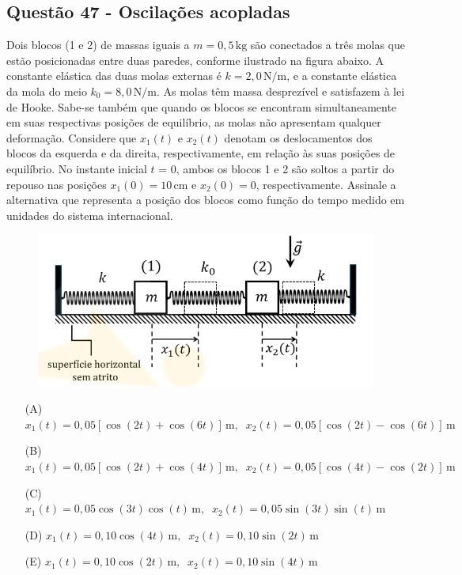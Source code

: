 \documentclass[a4paper,12pt]{article}
\begin{document}
\begin{flushleft}
\subsection{Quest\~ao 47 - Oscila\c{c}\~oes acopladas}

Dois blocos (1 e 2) de massas iguais a  $m = 0,5\,\text{kg}$ são conectados a três molas que
estão posicionadas entre duas paredes, conforme ilustrado na figura abaixo. A constante elástica das
duas molas externas é $k = 2,0\,\text{N/m}$, e a constante elástica da mola do meio $k_0 = 8,0\,\text{N/m}$. As molas
têm massa desprezível e satisfazem à lei de Hooke. Sabe-se também que quando os blocos se
encontram simultaneamente em suas respectivas posições de equilíbrio, as molas não apresentam
qualquer deformação. Considere que $x_1(t)$ e $x_2(t)$ denotam os deslocamentos dos blocos da esquerda
e da direita, respectivamente, em relação às suas posições de equilíbrio. No instante inicial $t$ = 0,
ambos os blocos 1 e 2 são soltos a partir do repouso nas posições $x_1(0)=10\,\text{cm}$ e $x_2(0)=0$,
respectivamente. Assinale a alternativa que representa a posição dos blocos como função do tempo
medido em unidades do sistema internacional.

\begin{figure}[!h]
  \centering
  \includegraphics[scale=0.5]{figures/sistema-massa-mola.png}
\end{figure}

\begin{itemize}
\item[(A)] $x_1(t)=0,05[\cos(2t)+\cos(6t)]\,\text{m}, \;\; x_2(t)=0,05[\cos(2t)-\cos(6t)]\,\text{m}$
\item[(B)] $x_1(t)=0,05[\cos(2t)+\cos(4t)]\,\text{m}, \;\; x_2(t)=0,05[\cos(4t)-\cos(2t)]\,\text{m}$
\item[(C)] $x_1(t)=0,05\cos(3t)\cos(t)\,\text{m}, \;\; x_2(t)=0,05\sin(3t)\sin(t)\,\text{m}$
\item[(D)] $x_1(t)=0,10\cos(4t)\,\text{m}, \;\; x_2(t)=0,10\sin(2t)\,\text{m}$
\item[(E)] $x_1(t)=0,10\cos(2t)\,\text{m}, \;\; x_2(t)=0,10\sin(4t)\,\text{m}$
\end{itemize}


\end{flushleft}
\end{document}
